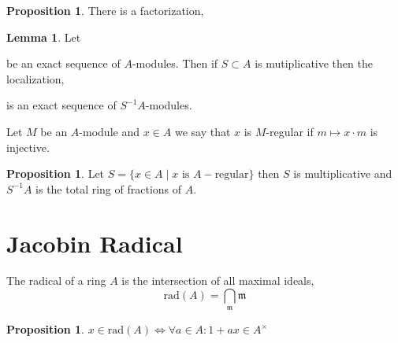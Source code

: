 \documentclass[12pt]{article}
\newcommand{\rad}[1]{\mathrm{rad}\left( #1 \right)}
\newcommand{\m}{\mathfrak{m}}
\theoremstyle{remark}
\theoremstyle{definition}
\newtheorem{lemma}[theorem]{Lemma}
\newtheorem{proposition}[theorem]{Proposition}
\newenvironment{definition}[1][Definition:]{\begin{trivlist}
\item[\hskip \labelsep {\bfseries #1}]}{\end{trivlist}}
\begin{document}
\begin{proposition}
There is a factorization,
\begin{center}
\end{center}
\end{proposition}


\begin{lemma}
Let 
\begin{center}
\end{center}
be an exact sequence of $A$-modules. Then if $S \subset A$ is mutiplicative then the localization,
\begin{center}
\end{center}
is an exact sequence of $S^{-1} A$-modules. 
\end{lemma}

\begin{definition}
Let $M$ be an $A$-module and $x \in A$ we say that $x$ is $M$-regular if $m \mapsto x \cdot m$ is injective.
\end{definition}

\begin{proposition}
Let $S =\{ x \in A \mid x \text{ is } A-\text{regular} \}$ then $S$ is multiplicative and $S^{-1} A$ is the total ring of fractions of $A$. 
\end{proposition}

\section{Jacobin Radical}

\begin{definition}
The radical of a ring $A$ is the intersection of all maximal ideals,
\[ \rad{A} = \bigcap_{\m} \m \]
\end{definition}

\begin{proposition}
$x \in \rad{A} \iff \forall a \in A : 1 + ax \in A^\times$
\end{proposition}
\end{document}

